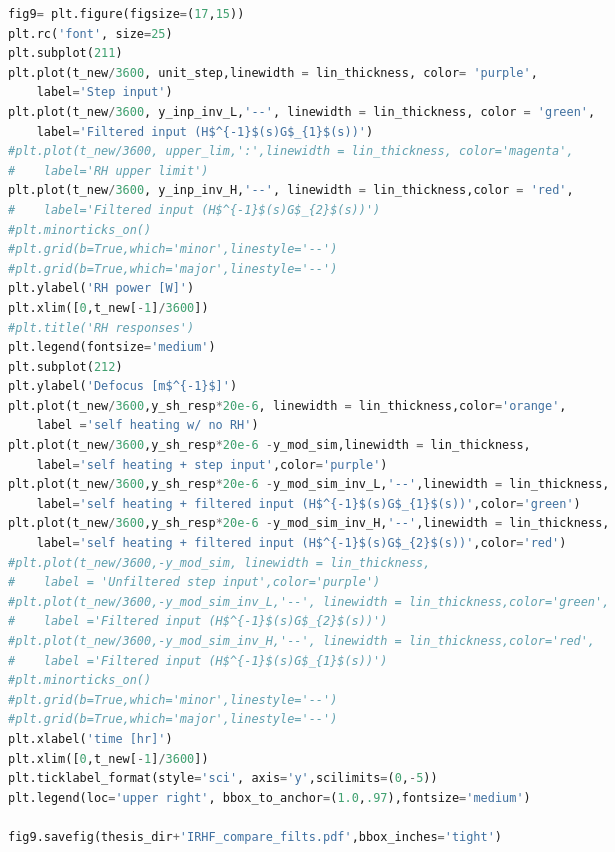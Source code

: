 
\begin{spacing}{1.2} \begin{lstlisting}[frame=single,language=Python]
fig9= plt.figure(figsize=(17,15))
plt.rc('font', size=25)
plt.subplot(211)
plt.plot(t_new/3600, unit_step,linewidth = lin_thickness, color= 'purple', 
    label='Step input')
plt.plot(t_new/3600, y_inp_inv_L,'--', linewidth = lin_thickness, color = 'green',
    label='Filtered input (H$^{-1}$(s)G$_{1}$(s))')
#plt.plot(t_new/3600, upper_lim,':',linewidth = lin_thickness, color='magenta', 
#    label='RH upper limit')
plt.plot(t_new/3600, y_inp_inv_H,'--', linewidth = lin_thickness,color = 'red', 
#    label='Filtered input (H$^{-1}$(s)G$_{2}$(s))')
#plt.minorticks_on()
#plt.grid(b=True,which='minor',linestyle='--')
#plt.grid(b=True,which='major',linestyle='--')
plt.ylabel('RH power [W]')
plt.xlim([0,t_new[-1]/3600])
#plt.title('RH responses')
plt.legend(fontsize='medium')
plt.subplot(212)
plt.ylabel('Defocus [m$^{-1}$]')
plt.plot(t_new/3600,y_sh_resp*20e-6, linewidth = lin_thickness,color='orange',
    label ='self heating w/ no RH')
plt.plot(t_new/3600,y_sh_resp*20e-6 -y_mod_sim,linewidth = lin_thickness,
    label='self heating + step input',color='purple')
plt.plot(t_new/3600,y_sh_resp*20e-6 -y_mod_sim_inv_L,'--',linewidth = lin_thickness,
    label='self heating + filtered input (H$^{-1}$(s)G$_{1}$(s))',color='green')
plt.plot(t_new/3600,y_sh_resp*20e-6 -y_mod_sim_inv_H,'--',linewidth = lin_thickness,
    label='self heating + filtered input (H$^{-1}$(s)G$_{2}$(s))',color='red')
#plt.plot(t_new/3600,-y_mod_sim, linewidth = lin_thickness,
#    label = 'Unfiltered step input',color='purple')
#plt.plot(t_new/3600,-y_mod_sim_inv_L,'--', linewidth = lin_thickness,color='green',
#    label ='Filtered input (H$^{-1}$(s)G$_{2}$(s))')
#plt.plot(t_new/3600,-y_mod_sim_inv_H,'--', linewidth = lin_thickness,color='red',
#    label ='Filtered input (H$^{-1}$(s)G$_{1}$(s))')
#plt.minorticks_on()
#plt.grid(b=True,which='minor',linestyle='--')
#plt.grid(b=True,which='major',linestyle='--')
plt.xlabel('time [hr]')
plt.xlim([0,t_new[-1]/3600])
plt.ticklabel_format(style='sci', axis='y',scilimits=(0,-5))
plt.legend(loc='upper right', bbox_to_anchor=(1.0,.97),fontsize='medium')

fig9.savefig(thesis_dir+'IRHF_compare_filts.pdf',bbox_inches='tight')
\end{lstlisting} \end{spacing}

